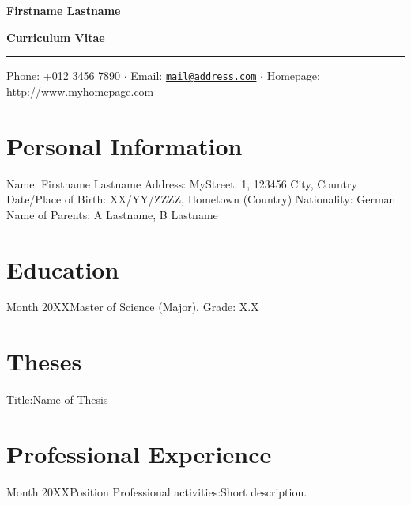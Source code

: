 \documentclass{tiny_cv}
\def\firstname{Firstname }
\def\familyname{Lastname}
\begin{document}
\begin{center}
\fontsize{30}{40}\selectfont \textbf{\firstname \familyname}
\end{center}

\begin{center}
\LARGE \textbf{Curriculum Vitae}
\end{center}

\noindent\rule{\textwidth}{1.2pt}

\begin{center}
{Phone: +012 3456 7890} $\cdot$ {Email: \href{mailto:mail@address.com}{\nolinkurl{mail@address.com}}} $\cdot$ {Homepage: \url{http://www.myhomepage.com}}
\end{center}


\section{Personal Information}
\identifyinginformationsubsection
{Name: \firstname \familyname}
{Address: MyStreet. 1, 123456 City, Country}
{Date/Place of Birth: XX/YY/ZZZZ, Hometown (Country)}
{Nationality: German}
{Name of Parents: A \familyname, B \familyname}

\section{Education}

                   {Month 20XX}{Master of Science (Major), Grade: X.X}

\section{Theses}
                 {Title:}{Name of Thesis}

\section{Professional Experience}

                         {Month 20XX}{Position}
                         {Professional activities:}{Short description.}
\end{document}
